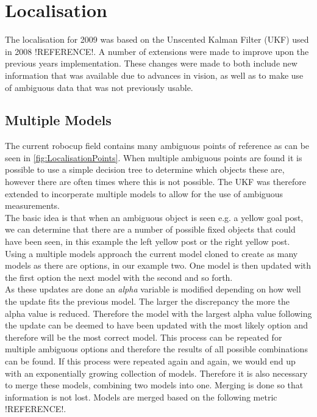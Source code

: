 \section{Localisation}
The localisation for 2009 was based on the Unscented Kalman Filter (UKF) used in 2008 !REFERENCE!. A number of extensions were 
made to improve upon the previous years implementation. These changes were made to both include new information that was available due to advances in vision, as well as to make use of ambiguous data that was not previously usable.\\

\subsection{Multiple Models}
The current robocup field contains many ambiguous points of reference as can be seen in \autoref{fig:LocalisationPoints}. When multiple ambiguous points are found it is possible to use a simple decision tree to determine which objects these are, however there are often times where this is not possible. The UKF was therefore extended to incorperate multiple models to allow for the use of ambiguous measurements.\\

The basic idea is that when an ambiguous object is seen e.g. a yellow goal post, we can determine that there are a number of possible fixed objects that could have been seen, in this example the left yellow post or the right yellow post. Using a multiple models approach the current model cloned to create as many models as there are options, in our example two. One model is then updated with the first option the next model with the second and so forth.\\

As these updates are done an \emph{alpha} variable is modified depending on how well the update fits the previous model. The larger the discrepancy the more the alpha value is reduced. Therefore the model with the largest alpha value following the update can be deemed to have been updated with the most likely option and therefore will be the most correct model. This process can be repeated for multiple ambiguous options and therefore the results of all possible combinations can be found.
If this process were repeated again and again, we would end up with an exponentially growing collection of models. Therefore it is also necessary to merge these models, combining two models into one. Merging is done so that information is not lost. Models are merged based on the following metric !REFERENCE!.\\

